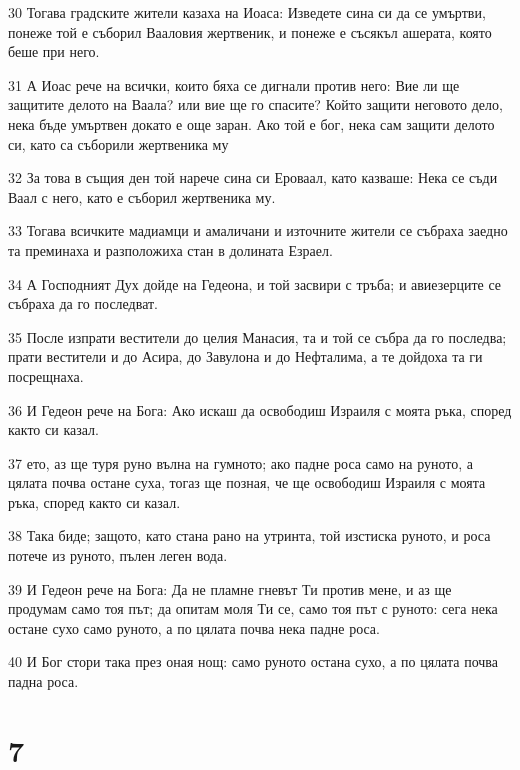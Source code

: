 \par 30 Тогава градските жители казаха на Иоаса: Изведете сина си да се умъртви, понеже той е съборил Вааловия жертвеник, и понеже е съсякъл ашерата, която беше при него.
\par 31 А Иоас рече на всички, които бяха се дигнали против него: Вие ли ще защитите делото на Ваала? или вие ще го спасите? Който защити неговото дело, нека бъде умъртвен докато е още заран. Ако той е бог, нека сам защити делото си, като са съборили жертвеника му
\par 32 За това в същия ден той нарече сина си Ероваал, като казваше: Нека се съди Ваал с него, като е съборил жертвеника му.
\par 33 Тогава всичките мадиамци и амаличани и източните жители се събраха заедно та преминаха и разположиха стан в долината Езраел.
\par 34 А Господният Дух дойде на Гедеона, и той засвири с тръба; и авиезерците се събраха да го последват.
\par 35 После изпрати вестители до целия Манасия, та и той се събра да го последва; прати вестители и до Асира, до Завулона и до Нефталима, а те дойдоха та ги посрещнаха.
\par 36 И Гедеон рече на Бога: Ако искаш да освободиш Израиля с моята ръка, според както си казал.
\par 37 ето, аз ще туря руно вълна на гумното; ако падне роса само на руното, а цялата почва остане суха, тогаз ще позная, че ще освободиш Израиля с моята ръка, според както си казал.
\par 38 Така биде; защото, като стана рано на утринта, той изстиска руното, и роса потече из руното, пълен леген вода.
\par 39 И Гедеон рече на Бога: Да не пламне гневът Ти против мене, и аз ще продумам само тоя път; да опитам моля Ти се, само тоя път с руното: сега нека остане сухо само руното, а по цялата почва нека падне роса.
\par 40 И Бог стори така през оная нощ: само руното остана сухо, а по цялата почва падна роса.

\chapter{7}

